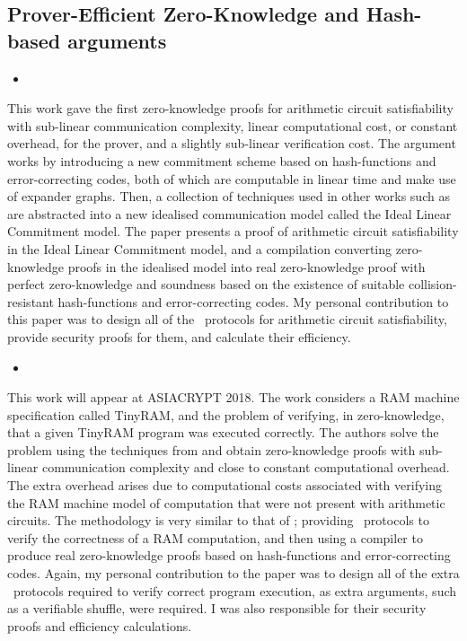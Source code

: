 \subsection*{Prover-Efficient Zero-Knowledge and Hash-based arguments}

\begin{itemize}
\item {}
\end{itemize}

This work gave the first zero-knowledge proofs for arithmetic circuit satisfiability with sub-linear communication complexity, linear computational cost, or constant overhead, for the prover, and a slightly sub-linear verification cost. The argument works by introducing a new commitment scheme based on hash-functions and error-correcting codes, both of which are computable in linear time and make use of expander graphs. Then, a collection of techniques used in other works such as \cite{Groth2009b} are abstracted into a new idealised communication model called the Ideal Linear Commitment model. The paper presents a proof of arithmetic circuit satisfiability in the Ideal Linear Commitment model, and a compilation converting zero-knowledge proofs in the idealised model into real zero-knowledge proof with perfect zero-knowledge and soundness based on the existence of suitable collision-resistant hash-functions and error-correcting codes. My personal contribution to this paper was to design all of the \ILC\ protocols for arithmetic circuit satisfiability, provide security proofs for them, and calculate their efficiency.

\begin{itemize}
\item {}
\end{itemize}

This work will appear at ASIACRYPT 2018. The work considers a RAM machine specification called TinyRAM, and the problem of verifying, in zero-knowledge, that a given TinyRAM program was executed correctly. The authors solve the problem using the techniques from \cite{BootleCGGHJ17} and obtain zero-knowledge proofs with sub-linear communication complexity and close to constant computational overhead. The extra overhead arises due to computational costs associated with verifying the RAM machine model of computation that were not present with arithmetic circuits. The methodology is very similar to that of \cite{BootleCGGHJ17}; providing \ILC\ protocols to verify the correctness of a RAM computation, and then using a compiler to produce real zero-knowledge proofs based on hash-functions and error-correcting codes. Again, my personal contribution to the paper was to design all of the extra \ILC\ protocols required to verify correct program execution, as extra arguments, such as a verifiable shuffle, were required. I was also responsible for their security proofs and efficiency calculations.

